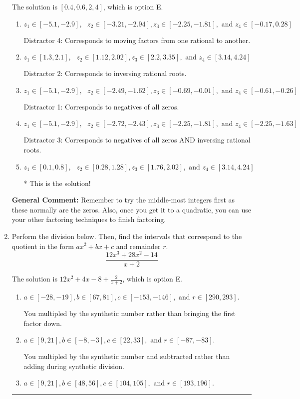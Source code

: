 \documentclass{extbook}[14pt]
\newcommand{\litem}[1]{\item #1

\rule{\textwidth}{0.4pt}}
\begin{document}
\begin{enumerate}
{The solution is \( [0.4, 0.6, 2, 4] \), which is option E.\begin{enumerate}[label=\Alph*.]
\item \( z_1 \in [-5.1, -2.9], \text{   }  z_2 \in [-3.21, -2.94], z_3 \in [-2.25, -1.81], \text{   and   } z_4 \in [-0.17, 0.28] \)

 Distractor 4: Corresponds to moving factors from one rational to another.
\item \( z_1 \in [1.3, 2.1], \text{   }  z_2 \in [1.12, 2.02], z_3 \in [2.2, 3.35], \text{   and   } z_4 \in [3.14, 4.24] \)

 Distractor 2: Corresponds to inversing rational roots.
\item \( z_1 \in [-5.1, -2.9], \text{   }  z_2 \in [-2.49, -1.62], z_3 \in [-0.69, -0.01], \text{   and   } z_4 \in [-0.61, -0.26] \)

 Distractor 1: Corresponds to negatives of all zeros.
\item \( z_1 \in [-5.1, -2.9], \text{   }  z_2 \in [-2.72, -2.43], z_3 \in [-2.25, -1.81], \text{   and   } z_4 \in [-2.25, -1.63] \)

 Distractor 3: Corresponds to negatives of all zeros AND inversing rational roots.
\item \( z_1 \in [0.1, 0.8], \text{   }  z_2 \in [0.28, 1.28], z_3 \in [1.76, 2.02], \text{   and   } z_4 \in [3.14, 4.24] \)

* This is the solution!
\end{enumerate}

\textbf{General Comment:} Remember to try the middle-most integers first as these normally are the zeros. Also, once you get it to a quadratic, you can use your other factoring techniques to finish factoring.
}
\litem{
Perform the division below. Then, find the intervals that correspond to the quotient in the form $ax^2+bx+c$ and remainder $r$.
\[ \frac{12x^{3} +28 x^{2} -14}{x + 2} \]

The solution is \( 12x^{2} +4 x -8 + \frac{2}{x + 2} \), which is option E.\begin{enumerate}[label=\Alph*.]
\item \( a \in [-28, -19], b \in [67, 81], c \in [-153, -146], \text{ and } r \in [290, 293]. \)

 You multipled by the synthetic number rather than bringing the first factor down.
\item \( a \in [9, 21], b \in [-8, -3], c \in [22, 33], \text{ and } r \in [-87, -83]. \)

 You multipled by the synthetic number and subtracted rather than adding during synthetic division.
\item \( a \in [9, 21], b \in [48, 56], c \in [104, 105], \text{ and } r \in [193, 196]. \)


\end{enumerate}}
\end{enumerate}
\end{document}
